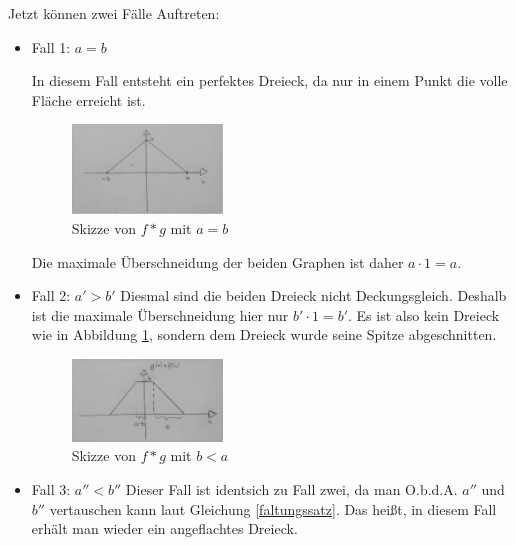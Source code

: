    Jetzt können zwei Fälle Auftreten:\\
   \begin{itemize}
       \item Fall 1: $a=b$
 
            In diesem Fall entsteht ein perfektes Dreieck, da nur in einem Punkt die volle Fläche erreicht ist.
            \begin{figure}[h]
                \centering
                \includegraphics[width = 4cm]{Bilder/FzV/frage6_3.jpg}
                \caption{Skizze von $f \ast g$ mit $a=b$}
                \label{faltung}
            \end{figure}
        Die maximale Überschneidung der beiden Graphen ist daher $a \cdot 1 = a$.
       \item Fall 2: $a'  > b'$
            Diesmal sind die beiden Dreieck nicht Deckungsgleich. Deshalb ist die maximale Überschneidung hier nur $b' \cdot 1 = b'$. 
            Es ist also kein Dreieck wie in Abbildung \ref{faltung}, sondern dem Dreieck wurde seine Spitze abgeschnitten. 
            \newpage
            \begin{figure}[h]
                \centering
                \includegraphics[width = 4cm]{Bilder/FzV/frage6_4.jpg}
                \caption{Skizze von $f\ast g$ mit $b < a$}
            \end{figure}
        \item Fall 3: $a''< b''$
            Dieser Fall ist identsich zu Fall zwei, da man O.b.d.A. $a''$ und $b''$ vertauschen kann laut Gleichung \ref{faltungssatz}.
            Das heißt, in diesem Fall erhält man wieder ein angeflachtes Dreieck.
   \end{itemize}
